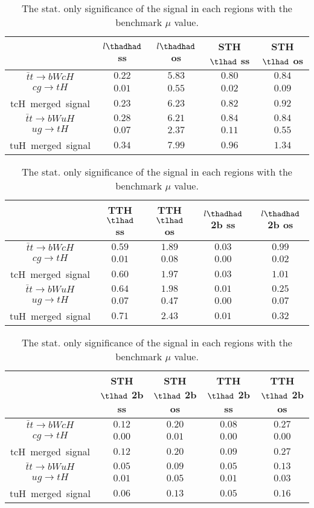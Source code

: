 \begin{table}
\footnotesize
\caption{The stat. only significance of the signal in each regions with the benchmark $\mu$ value.}
\centering
\begin{tabular}{|c|c|c|c|c|} \hline
 & $l\thadhad$ ss & $l\thadhad$ os & STH $\tlhad$ ss & STH $\tlhad$ os\\\hline
$\bar{t}t\to bWcH$ & $0.22$ & $5.83$ & $0.80$ & $0.84$\\\hline
$cg\to tH$ & $0.01$ & $0.55$ & $0.02$ & $0.09$\\\hline
tcH~merged~signal & $0.23$ & $6.23$ & $0.82$ & $0.92$\\\hline
$\bar{t}t\to bWuH$ & $0.28$ & $6.21$ & $0.84$ & $0.84$\\\hline
$ug\to tH$ & $0.07$ & $2.37$ & $0.11$ & $0.55$\\\hline
tuH~merged~signal & $0.34$ & $7.99$ & $0.96$ & $1.34$\\\hline
\end{tabular}
\begin{tabular}{|c|c|c|c|c|} \hline
 & TTH $\tlhad$ ss & TTH $\tlhad$ os & $l\thadhad$ 2b ss & $l\thadhad$ 2b os\\\hline
$\bar{t}t\to bWcH$ & $0.59$ & $1.89$ & $0.03$ & $0.99$\\\hline
$cg\to tH$ & $0.01$ & $0.08$ & $0.00$ & $0.02$\\\hline
tcH~merged~signal & $0.60$ & $1.97$ & $0.03$ & $1.01$\\\hline
$\bar{t}t\to bWuH$ & $0.64$ & $1.98$ & $0.01$ & $0.25$\\\hline
$ug\to tH$ & $0.07$ & $0.47$ & $0.00$ & $0.07$\\\hline
tuH~merged~signal & $0.71$ & $2.43$ & $0.01$ & $0.32$\\\hline
\end{tabular}
\begin{tabular}{|c|c|c|c|c|} \hline
 & STH $\tlhad$ 2b ss & STH $\tlhad$ 2b os & TTH $\tlhad$ 2b ss & TTH $\tlhad$ 2b os\\\hline
$\bar{t}t\to bWcH$ & $0.12$ & $0.20$ & $0.08$ & $0.27$\\\hline
$cg\to tH$ & $0.00$ & $0.01$ & $0.00$ & $0.00$\\\hline
tcH~merged~signal & $0.12$ & $0.20$ & $0.09$ & $0.27$\\\hline
$\bar{t}t\to bWuH$ & $0.05$ & $0.09$ & $0.05$ & $0.13$\\\hline
$ug\to tH$ & $0.01$ & $0.05$ & $0.01$ & $0.03$\\\hline
tuH~merged~signal & $0.06$ & $0.13$ & $0.05$ & $0.16$\\\hline
\end{tabular}
\label{tab:significance}
\end{table}

